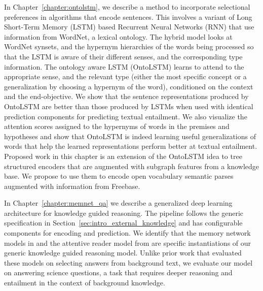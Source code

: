In Chapter~\ref{chapter:ontolstm}, we describe a method to incorporate selectional 
preferences in algorithms that encode sentences. This involves a variant of Long Short-Term
Memory (LSTM) based Recurrent Neural Networks (RNN) that use information
from WordNet, a lexical 
ontology. The hybrid model looks at WordNet synsets, and the hypernym hierarchies of the
words being processed so that the 
LSTM is aware of their different senses, and the corresponding type information.
The ontology aware LSTM (OntoLSTM) learns to attend to the appropriate sense,
and the relevant type 
(either the most specific concept or a generalization by choosing a hypernym of
the word), conditioned on the context and the end-objective. We show that the sentence representations 
produced by OntoLSTM are better than those produced by LSTMs when used with identical prediction 
components for predicting textual entailment. We also visualize the attention scores assigned to the hypernyms 
of words in the premises and hypotheses and show that OntoLSTM is indeed learning useful generalizations of words
that help the learned representations perform better at textual entailment. Proposed work in this chapter is an extension
of the OntoLSTM idea to tree structured encoders that are augmented with subgraph features from a knowledge base. We propose 
to use them to encode open vocabulary semantic parses augmented with information from Freebase.

In Chapter~\ref{chapter:memnet_qa} we describe a generalized deep learning architecture for knowledge guided reasoning.
The pipeline follows the generic specification in Section~\ref{sec:intro_external_knowledge} and has configurable components
for encoding and prediction. We identify that the memory network models in \cite{weston2014memory,Sukhbaatar2015EndToEndMN,Xiong2016DynamicMN}
and the attentive reader model from \cite{hermann2015teaching} are specific instantiations of our generic knowledge guided reasoning model.
Unlike prior work that evaluated these models on selecting answers from background text, we evaluate our model on answering science questions, 
a task that requires deeper reasoning and entailment in the context of background knowledge.

